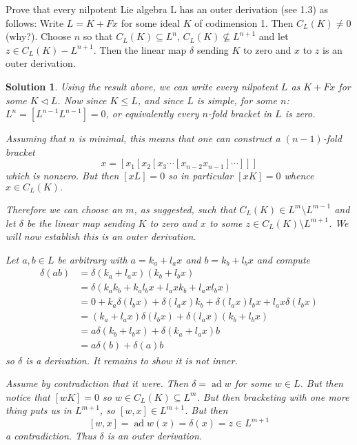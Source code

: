 \documentclass[12pt]{article}
\newenvironment{hwprob}[1]
{\renewcommand{\theprob}{#1}%
 \addtocounter{thm}{-1}%
 \begin{prob}}
{\end{prob}}
\theoremstyle{nonumberbreak}
\newtheorem{sol}{Solution}
\theoremstyle{changebreak}
\theoremstyle{nonumberbreak}
\theoremstyle{change}
\DeclareMathOperator{\ad}{ad}
\begin{document}
\begin{hwprob}{3.9}
	Prove that every nilpotent Lie algebra L has an outer derivation (see 1.3) as follows: Write $L=K+Fx$
	for some ideal $K$ of codimension 1. Then $C_L(K)\ne 0$ (why?). Choose $n$ so that $C_L(K)\subseteq L^n$,
	$C_L(K)\not\subseteq L^{n+1}$ and let $z\in C_L(K)-L^{n+1}$. Then the linear map $\delta$ sending $K$ to zero
	and $x$ to $z$ is an outer derivation.
\end{hwprob}
\begin{sol}
	Using the result above, we can write every nilpotent $L$ as $K+Fx$ for some $K\lhd L$.
	Now since $K\le L$, and since $L$ is simple, for some $n$: $L^n=[L^{n-1}L^{n-1}]=0$,
	or equivalently every $n$-fold bracket in $L$ is zero.

	Assuming that $n$ is minimal, this means that one can construct a $(n-1)$-fold bracket
	\[x=[x_1[x_2[x_3\cdots[x_{n-2}x_{n-1}]\cdots]]]\]
	which is nonzero. But then $[xL]=0$ so in particular $[xK]=0$ whence $x\in C_L(K).$

	Therefore we can choose an $m$, as suggested, such that $C_L(K)\in L^m\setminus L^{m-1}$
	and let $\delta$ be the linear map sending $K$ to zero and $x$ to some $z\in C_L(K)\setminus L^{m+1}$.
	We will now establish this is an outer derivation.

	Let $a,b\in L$ be arbitrary with $a=k_a+l_ax$ and $b=k_b+l_bx$ and compute
	\begin{align*}
		\delta(ab) &= \delta(k_a+l_ax)(k_b+l_bx)\\
		&= \delta(k_ak_b+k_al_bx+l_axk_b+l_axl_bx)\\
		&=0+k_a\delta(l_bx)+\delta(l_ax)k_b+\delta(l_ax)l_bx+l_ax\delta(l_bx)\\
		&=(k_a+l_ax)\delta(l_bx)+\delta(l_ax)(k_b+l_bx)\\
		&=a\delta(k_b+l_bx)+\delta(k_a+l_ax)b\\
		&=a\delta(b)+ \delta(a)b
	\end{align*}
	so $\delta$ is a derivation. It remains to show it is not inner.

	Assume by contradiction that it were. Then $\delta =\ad w$ for some $w\in L$. But then notice
	that $[wK]=0$ so $w\in C_L(K)\subseteq L^m$. But then bracketing with one more thing puts us in $L^{m+1}$, so
	$[w,x]\in L^{m+1}$. But then
	\[[w,x]=\ad w(x)=\delta(x)=z\in L^{m+1}\]
	a contradiction. Thus $\delta$ is an outer derivation.
\end{sol}
\end{document}

